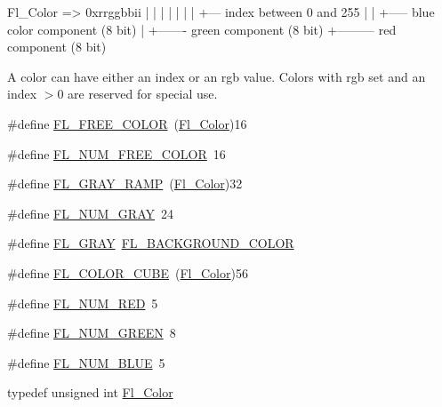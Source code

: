 \begin{DoxyPre}
 Fl\_Color => 0xrrggbbii
                | | | |
                | | | +--- index between 0 and 255
                | | +----- blue color component (8 bit)
                | +------- green component (8 bit)
                +--------- red component (8 bit)
 \end{DoxyPre}


A color can have either an index or an rgb value. Colors with rgb set and an index $>$0 are reserved for special use. \begin{DoxyCompactItemize}
\item 
\#define \hyperlink{_enumerations_8_h_aa8fe2e5047a2dd1be37e8336dfca918d}{F\+L\+\_\+\+F\+R\+E\+E\+\_\+\+C\+O\+L\+OR}~(\hyperlink{_enumerations_8_h_a8b762953646f8abee866061f1af78a6a}{Fl\+\_\+\+Color})16
\item 
\#define \hyperlink{_enumerations_8_h_a4bdca88def38f2e216377f69ea530954}{F\+L\+\_\+\+N\+U\+M\+\_\+\+F\+R\+E\+E\+\_\+\+C\+O\+L\+OR}~16
\item 
\#define \hyperlink{_enumerations_8_h_ad6657159174ebe4d3b6f1b3e777e98c9}{F\+L\+\_\+\+G\+R\+A\+Y\+\_\+\+R\+A\+MP}~(\hyperlink{_enumerations_8_h_a8b762953646f8abee866061f1af78a6a}{Fl\+\_\+\+Color})32
\item 
\#define \hyperlink{_enumerations_8_h_a389c78c6cb1615efe55dfc06b935ec10}{F\+L\+\_\+\+N\+U\+M\+\_\+\+G\+R\+AY}~24
\item 
\#define \hyperlink{_enumerations_8_h_aabb3b3628ea5baa2ba176201ed5d2aba}{F\+L\+\_\+\+G\+R\+AY}~\hyperlink{_enumerations_8_h_aa1c7250c485966fcd5c49f1bdc3a6587}{F\+L\+\_\+\+B\+A\+C\+K\+G\+R\+O\+U\+N\+D\+\_\+\+C\+O\+L\+OR}
\item 
\#define \hyperlink{_enumerations_8_h_aa7c78133d1b30447471ac02feb40c553}{F\+L\+\_\+\+C\+O\+L\+O\+R\+\_\+\+C\+U\+BE}~(\hyperlink{_enumerations_8_h_a8b762953646f8abee866061f1af78a6a}{Fl\+\_\+\+Color})56
\item 
\#define \hyperlink{_enumerations_8_h_a696105c253ebbfd89d9dfc37357ed728}{F\+L\+\_\+\+N\+U\+M\+\_\+\+R\+ED}~5
\item 
\#define \hyperlink{_enumerations_8_h_aff583e05dea4ac7ec09c3f1760a503c0}{F\+L\+\_\+\+N\+U\+M\+\_\+\+G\+R\+E\+EN}~8
\item 
\#define \hyperlink{_enumerations_8_h_a35ff0c922707d57042cd509c88f88fea}{F\+L\+\_\+\+N\+U\+M\+\_\+\+B\+L\+UE}~5
\item 
typedef unsigned int \hyperlink{_enumerations_8_h_a8b762953646f8abee866061f1af78a6a}{Fl\+\_\+\+Color}
\item 

\end{DoxyCompactItemize}
